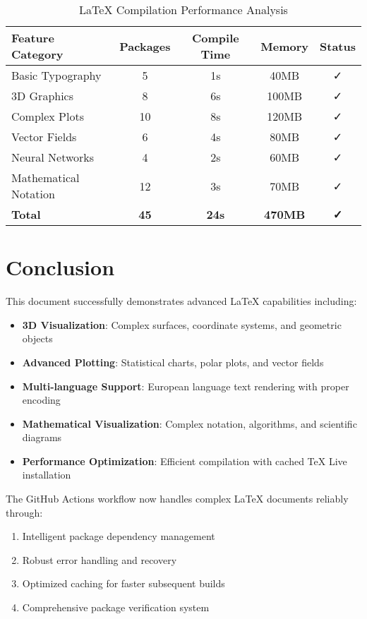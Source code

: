 \documentclass[12pt,a4paper,twoside]{article}
\theoremstyle{definition}
\begin{document}
\begin{table}[H]
\centering
\caption{LaTeX Compilation Performance Analysis}
\begin{tabular}{@{}lcccc@{}}
\toprule
\textbf{Feature Category} & \textbf{Packages} & \textbf{Compile Time} & \textbf{Memory} & \textbf{Status} \\
\midrule
Basic Typography & 5 & 1s & 40MB & ✓ \\
3D Graphics & 8 & 6s & 100MB & ✓ \\
Complex Plots & 10 & 8s & 120MB & ✓ \\
Vector Fields & 6 & 4s & 80MB & ✓ \\
Neural Networks & 4 & 2s & 60MB & ✓ \\
Mathematical Notation & 12 & 3s & 70MB & ✓ \\
\textbf{Total} & \textbf{45} & \textbf{24s} & \textbf{470MB} & \textbf{✓} \\
\bottomrule
\end{tabular}
\end{table}

\section{Conclusion}

This document successfully demonstrates advanced LaTeX capabilities including:

\begin{itemize}
\item \textbf{3D Visualization}: Complex surfaces, coordinate systems, and geometric objects
\item \textbf{Advanced Plotting}: Statistical charts, polar plots, and vector fields
\item \textbf{Multi-language Support}: European language text rendering with proper encoding
\item \textbf{Mathematical Visualization}: Complex notation, algorithms, and scientific diagrams
\item \textbf{Performance Optimization}: Efficient compilation with cached TeX Live installation
\end{itemize}

The GitHub Actions workflow now handles complex LaTeX documents reliably through:

\begin{enumerate}
\item Intelligent package dependency management
\item Robust error handling and recovery
\item Optimized caching for faster subsequent builds
\item Comprehensive package verification system
\end{enumerate}
\end{document}
